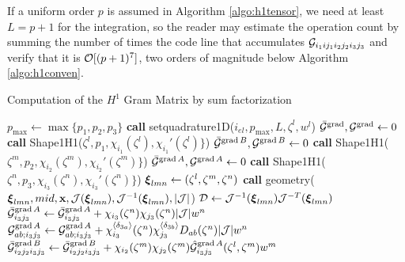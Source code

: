 If a uniform order $p$ is assumed in Algorithm \ref{algo:h1tensor}, we need at least $L=p+1$ for the integration, so the reader may estimate the operation count by summing the number of times the code line that accumulates $\mathcal{G}_{i_1ij_1i_2j_2i_3j_3}$ and verify that it is $\mathcal{O}[(p+1)^7]$, two orders of magnitude below Algorithm \ref{algo:h1conven}.
% 
\begin{algorithm}[ht!]
\caption{Computation of the $H^1$ Gram Matrix by sum factorization}\label{algo:h1tensor}
\begin{algorithmic}
\State $p_{\max}\gets\max\{p_1,p_2,p_3\}$
\State\textbf{call }setquadrature1D($i_{el},p_{\max},L,\zeta^l,w^l$)
\State $\bar{\mathcal{G}}^{\operatorname{grad}},\mathcal{G}^{\operatorname{grad}}\gets 0$
    \State\textbf{call } Shape1H1($\zeta^l,p_1,\chi_{i_1}(\zeta^l),\chi_{i_1}'(\zeta^l)\}$) 
            \State $\bar{\mathcal{G}}^{\operatorname{grad} B},\mathcal{G}^{\operatorname{grad} B}\gets 0$
                \State\textbf{call } Shape1H1($\zeta^m,p_2,\chi_{i_2}(\zeta^m),\chi_{i_2}'(\zeta^m)\}$) 
                \State $\bar{\mathcal{G}}^{\operatorname{grad} A},\mathcal{G}^{\operatorname{grad} A}\gets 0$
                    \State\textbf{call } Shape1H1($\zeta^n,p_3,\chi_{i_3}(\zeta^n),\chi_{i_3}'(\zeta^n)\}$) 
                    \State $\boldsymbol{\xi}_{lmn}\gets (\zeta^l,\zeta^m,\zeta^n)$
                    \State\textbf{call } geometry( $\boldsymbol{\xi}_{lmn},mid,\mathbf{x},\mathcal{J}(\boldsymbol{\xi}_{lmn}),\mathcal{J}^{-1}(\boldsymbol{\xi}_{lmn}),|\mathcal{J}|$)
                    \State $\mathcal{D}\gets\mathcal{J}^{-1}(\boldsymbol{\xi}_{lmn})\mathcal{J}^{-T}(\boldsymbol{\xi}_{lmn})$
                    \State$\bar{\mathcal{G}}_{i_3j_3}^{\operatorname{grad} A}\gets \bar{\mathcal{G}}_{i_3j_3}^{\operatorname{grad} A}+ \chi_{i_3}(\zeta^n)\chi_{j_3}(\zeta^n)|\mathcal{J}|w^n$ 
                        \State$\mathcal{G}_{ab;i_3j_3}^{\operatorname{grad} A}\gets \mathcal{G}_{ab;i_3j_3}^{\operatorname{grad} A}+ \chi_{i_3}^{\langle\delta_{3a}\rangle}(\zeta^n)\chi_{j_3}^{\langle\delta_{3b}\rangle}D_{ab}(\zeta^n)|\mathcal{J}|w^n$                         
                    \EndFor                    
                \EndFor
                    \State$\bar{\mathcal{G}}_{i_2j_2i_3j_3}^{\operatorname{grad} B}\gets \bar{\mathcal{G}}_{i_2j_2i_3j_3}^{\operatorname{grad} B}+ \chi_{i_2}(\zeta^m)\chi_{j_2}(\zeta^m)\hat{\mathcal{G}}_{i_3j_3}^{\operatorname{grad} A}(\zeta^l,\zeta^m)w^m$ 

\end{algorithmic}
\end{algorithm}

